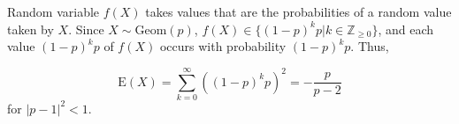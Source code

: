 Random variable $f(X)$ takes values that are the probabilities of a random value
taken by $X$. Since $X \sim \text{Geom}(p)$, $f(X) \in \{ (1-p)^{k}p | k \in
\mathbb{Z}_{\geq 0} \}$, and each value $(1-p)^{k}p$ of $f(X)$ occurs with
probability $(1-p)^{k}p$. Thus,

$$\text{E}(X) = \sum_{k=0}^{\infty}((1-p)^{k}p)^{2} = -\frac{p}{p-2}$$ for $|p -
1|^{2} < 1$.